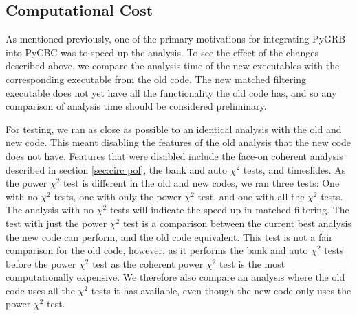 \documentclass[11pt]{cuthesis}
\begin{document}
\subsection{Computational Cost} \label{sec:speed gains}
As mentioned previously, one of the primary motivations for integrating PyGRB into PyCBC was to speed up the analysis. To see the effect of the changes described above, we compare the analysis time of the new executables with the corresponding executable from the old code. The new matched filtering executable does not yet have all the functionality the old code has, and so any comparison of analysis time should be considered preliminary. 

For testing, we ran as close as possible to an identical analysis with the old and new code. This meant disabling the features of the old analysis that the new code does not have. Features that were disabled include the face-on coherent analysis described in section \ref{sec:circ pol}, the bank and auto $\chi^2$ tests, and timeslides. As the power $\chi^2$ test is different in the old and new codes, we ran three tests: One with no $\chi^2$ tests, one with only the power $\chi^2$ test, and one with all the $\chi^2$ tests. The analysis with no $\chi^2$ tests will indicate the speed up in matched filtering. The test with just the power $\chi^2$ test is a comparison between the current best analysis the new code can perform, and the old code equivalent. This test is not a fair comparison for the old code, however, as it performs the bank and auto $\chi^2$ tests before the power $\chi^2$ test as the coherent power $\chi^2$ test is the most computationally expensive. We therefore also compare an analysis where the old code uses all the $\chi^2$ tests it has available, even though the new code only uses the power $\chi^2$ test. 
\end{document}
